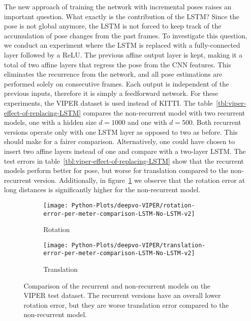 		The new approach of training the network with incremental poses raises an important question.
		What exactly is the contribution of the LSTM?
		Since the pose is not global anymore, the LSTM is not forced to keep track of the accumulation of pose changes from the past frames.
		To investigate this question, we conduct an experiment where the LSTM is replaced with a fully-connected layer followed by a ReLU.
		The previous affine output layer is kept, making it a total of two affine layers that regress the pose from the CNN features.
		This eliminates the recurrence from the network, and all pose estimations are performed solely on consecutive frames.
		Each output is independent of the previous inputs, therefore it is simply a feedforward network.
		For these experiments, the VIPER dataset is used instead of KITTI.
		The table~\ref{tbl:viper-effect-of-replacing-LSTM} compares the non-recurrent model with two recurrent models, one with a hidden size $d = 1000$ and one with $d = 500$.
		Both recurrent versions operate only with one LSTM layer as opposed to two as before.
		This should make for a fairer comparison.
		Alternatively, one could have chosen to insert two affine layers instead of one and compare with a two-layer LSTM.
		The test errors in table~\ref{tbl:viper-effect-of-replacing-LSTM} show that the recurrent models perform better for pose, but worse for translation compared to the non-recurrent version.
		Additionally, in figure~\ref{fig:avg-rotation-error-VIPER-LSTM-no-LSTM} we observe that the rotation error at long distances is significantly higher for the non-recurrent model.
		
		\begin{figure}
			\centering
			\begin{subfigure}[b]{0.5\linewidth}
				\centering
				\texttt{[image: Python-Plots/deepvo-VIPER/rotation-error-per-meter-comparison-LSTM-No-LSTM-v2]}
				\caption{
					Rotation
					\label{fig:avg-rotation-error-VIPER-LSTM-no-LSTM}
				}
			\end{subfigure}%
			\begin{subfigure}[b]{0.5\linewidth}
				\centering
				\texttt{[image: Python-Plots/deepvo-VIPER/translation-error-per-meter-comparison-LSTM-No-LSTM-v2]}
				\caption{
					Translation
					\label{fig:avg-translation-error-VIPER-LSTM-no-LSTM}
				}
			\end{subfigure}%
			\caption[Experiments on VIPER: The effect of replacing the LSTM]
					{Comparison of the recurrent and non-recurrent models on the VIPER test dataset.
					 The recurrent versions have an overall lower rotation error, but they are worse translation error compared to the non-recurrent model.
					 \label{fig:viper-effect-of-replacing-LSTM}}
		\end{figure}
		
